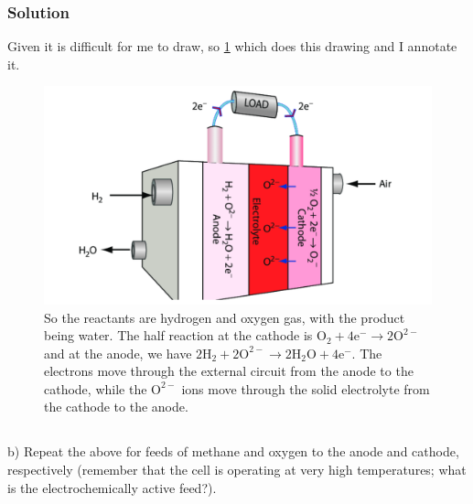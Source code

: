 \documentclass[12pt]{article}
\begin{document}
\subsubsection{Solution}
Given it is difficult for me to draw, so \ref{sofc_h2} which does this drawing and I annotate it.
\begin{figure}[h!]
    \centering
    \includegraphics[width=\textwidth]{SOFC_h2.png}
    \caption{So the reactants are hydrogen and oxygen gas, with the product being water. The half reaction at the cathode is $ \mathrm{O}_{2} + 4 \mathrm{e}^{-} \rightarrow 2 \mathrm{O}^{2-}$ and at the anode, we have $2 \mathrm{H}_{2} + 2 \mathrm{O}^{2-} \rightarrow 2 \mathrm{H}_{2} \mathrm{O} + 4 \mathrm{e}^{-}$. The electrons move through the external circuit from the anode to the cathode, while the $\mathrm{O}^{2-}$ ions move through the solid electrolyte from the cathode to the anode.}
\label{sofc_h2}
\end{figure}



\subsection{}
b) Repeat the above for feeds of methane and oxygen to the anode and cathode, respectively (remember that the cell is operating at very high temperatures; what is the electrochemically active feed?).
\end{document}
